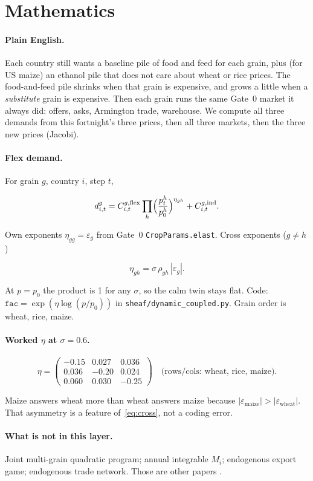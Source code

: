 \section{Mathematics}
\label{sec:math}

\paragraph{Plain English.}
Each country still wants a baseline pile of food and feed for each grain,
plus (for US maize) an ethanol pile that does not care about wheat or rice
prices. The food-and-feed pile shrinks when that grain is expensive, and
grows a little when a \emph{substitute} grain is expensive. Then each grain
runs the same Gate~0 market it always did: offers, asks, Armington trade,
warehouse. We compute all three demands from this fortnight's three prices,
then all three markets, then the three new prices (Jacobi).

\paragraph{Flex demand.}
For grain \(g\), country \(i\), step \(t\),

\begin{equation}
  d^g_{i,t}
  = C^{g,\mathrm{flex}}_{i,t}
    \prod_h \Bigl(\frac{p^h_t}{p^h_0}\Bigr)^{\eta_{gh}}
  + C^{g,\mathrm{ind}}_{i,t}.
  \label{eq:flex}
\end{equation}

Own exponents \(\eta_{gg}=\varepsilon_g\) from Gate~0
\texttt{CropParams.elast}. Cross exponents (\(g\neq h\))

\begin{equation}
  \eta_{gh}=\sigma\,\rho_{gh}\,|\varepsilon_g|.
  \label{eq:cross}
\end{equation}

At \(p=p_0\) the product is 1 for any \(\sigma\), so the calm twin stays
flat. Code: \(\mathtt{fac}=\exp(\eta\log(p/p_0))\) in
\texttt{sheaf/dynamic\_coupled.py}. Grain order is wheat, rice, maize.

\paragraph{Worked \(\eta\) at \(\sigma=0.6\).}

\[
\eta =
\begin{pmatrix}
-0.15 & 0.027 & 0.036 \\
 0.036 & -0.20 & 0.024 \\
 0.060 & 0.030 & -0.25
\end{pmatrix}
\quad
\text{(rows/cols: wheat, rice, maize).}
\]

Maize answers wheat more than wheat answers maize because
\(|\varepsilon_{\mathrm{maize}}|>|\varepsilon_{\mathrm{wheat}}|\). That
asymmetry is a feature of~\eqref{eq:cross}, not a coding error.

\paragraph{What is not in this layer.}
Joint multi-grain quadratic program; annual integrable \(M_i\); endogenous
export game; endogenous trade network. Those are other papers
\citep{armington1969}.

